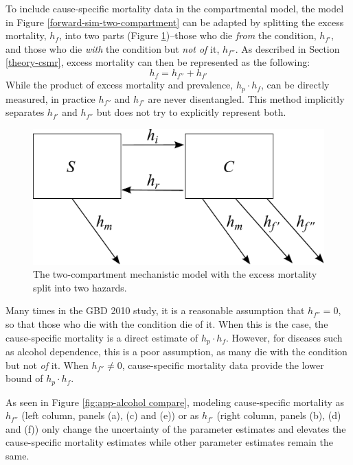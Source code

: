 To include cause-specific mortality data in the compartmental model,
the model in Figure \ref{forward-sim-two-compartment} can be adapted
by splitting the excess mortality, $h_{f}$, into two parts (Figure
\ref{fig:two_compartment_2f})--those who die \emph{from} the
condition, $h_{f'}$, and those who die \emph{with} the condition but
\emph{not of} it, $h_{f''}$.  As described in Section
\ref{theory-csmr}, excess mortality can then be represented as the
following:
    \begin{equation}
        h_{f} = h_{f''} + h_{f'}
    \end{equation}
While the product of excess mortality and prevalence, $h_{p} \cdot h_{f}$,
can be directly measured, in practice $h_{f''}$ and $h_{f'}$ are never
disentangled.  This method implicitly separates $h_{f'}$ and $h_{f''}$
but does not try to explicitly represent both.

    \begin{figure}[h]
        \begin{center}
            \includegraphics[width=\textwidth]{SC2.pdf}
            \caption{The two-compartment mechanistic model with the
              excess mortality split into two hazards.}
            \label{fig:two_compartment_2f}
        \end{center}
    \end{figure}

Many times in the GBD 2010 study, it is a reasonable assumption that
$h_{f''} = 0$, so that those who die with the condition die of it.
When this is the case, the cause-specific mortality is a direct
estimate of $h_{p} \cdot h_{f}$.  However, for diseases such as alcohol
dependence, this is a poor assumption, as many die with the condition
but not \emph{of} it.  When $h_{f''} \neq 0$, cause-specific mortality
data provide the lower bound of $h_{p} \cdot h_{f}$.

As seen in Figure \ref{fig:app-alcohol compare}, modeling cause-specific mortality as
$h_{f''}$ (left column, panels (a), (c) and (e)) or as $h_{f'}$ (right
column, panels (b), (d) and (f)) only change the uncertainty of the
parameter estimates and elevates the cause-specific mortality
estimates while other parameter estimates remain the same.

